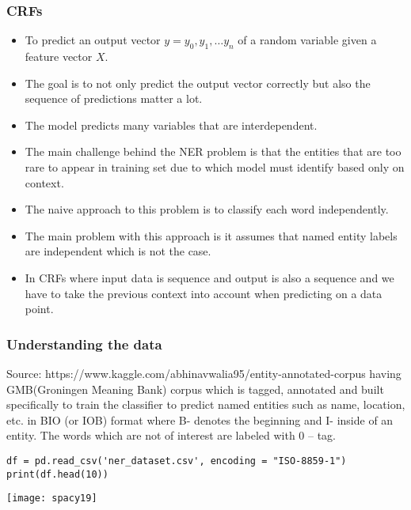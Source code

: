 \begin{frame}[fragile]\frametitle{CRFs}
  \begin{itemize}
  \item To predict an output vector $y = {y_0, y_1, \ldots y_n}$ of a random variable given a feature vector $X$.
	\item The goal is to not only predict the output vector correctly but also the sequence of predictions matter a lot.
	\item The model predicts many variables that are interdependent.
	\item The main challenge behind the NER problem is that the entities that are too rare to appear in training set due to which model must identify based only on context. 
	\item The naive approach to this problem is to classify each word independently. 
	\item The main problem with this approach is it assumes that named entity labels are independent which is not the case.
	\item In CRFs where input data is sequence and output is also a sequence and we have to take the previous context into account when predicting on a data point.
  \end{itemize}
	

\end{frame}

\begin{frame}[fragile]\frametitle{Understanding the data}

Source: https://www.kaggle.com/abhinavwalia95/entity-annotated-corpus having GMB(Groningen Meaning Bank) corpus which is tagged, annotated and built specifically to train the classifier to predict named entities such as name, location, etc. in BIO (or IOB) format where  B- denotes the beginning and I- inside of an entity. The words which are not of interest are labeled with 0 – tag.

\begin{lstlisting}
df = pd.read_csv('ner_dataset.csv', encoding = "ISO-8859-1")
print(df.head(10))
\end{lstlisting}


\begin{center}
\texttt{[image: spacy19]}
\end{center}

\end{frame}


